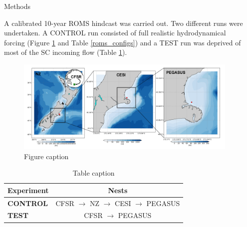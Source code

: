 \documentclass[final]{beamer}
\newlength{\sepwid}
\newlength{\onecolwid}
\newlength{\twocolwid}
\begin{document}
\begin{frame}[t]
\begin{columns}[t]
\begin{column}{\sepwid}\end{column} %

\begin{column}{\twocolwid} %

    \begin{columns}[t,totalwidth=\twocolwid] %

        \begin{column}{\onecolwid}\vspace{-.6in} %


            \begin{block}{Methods}

            A calibrated 10-year ROMS hindcast was carried out. Two different runs were undertaken. A CONTROL run consisted of full realistic hydrodynamical forcing (Figure \ref{domains} and Table \ref{roms_configs}) and a TEST run was deprived of most of the SC incoming flow (Table \ref{experiments}).  

            \begin{figure}
            \includegraphics[width=0.9\linewidth]{domains.png}
            \caption{\label{domains} Figure caption}
            \end{figure}

            \begin{small}

            \begin{table}
            \vspace{2ex}
            \begin{tabular}{l c}
            \toprule
            \textbf{Experiment} & \textbf{Nests} \\
            \midrule
            \textbf{CONTROL} & CFSR $\rightarrow$ NZ $\rightarrow$ CESI $\rightarrow$ PEGASUS \\
            \textbf{TEST}    & CFSR $\rightarrow$ PEGASUS \\
            \bottomrule
            \end{tabular}
            \caption{\label{experiments} Table caption}
            \end{table}



\end{small}
\end{block}
\end{column}
\end{columns}
\end{column}
\end{columns}
\end{frame}
\end{document}
